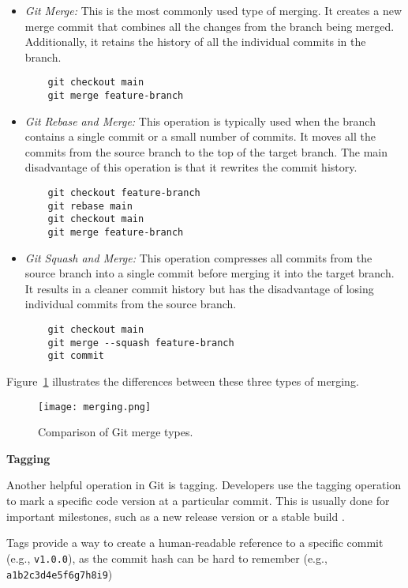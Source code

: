 \begin{itemize}
    \item \textit{Git Merge:} This is the most commonly used type of merging. It creates a new merge commit that combines all the changes from the branch being merged. Additionally, it retains the history of all the individual commits in the branch.
    \begin{verbatim}
    git checkout main
    git merge feature-branch
    \end{verbatim}

    \item \textit{Git Rebase and Merge:} This operation is typically used when the branch contains a single commit or a small number of commits. It moves all the commits from the source branch to the top of the target branch. The main disadvantage of this operation is that it rewrites the commit history.
    \begin{verbatim}
    git checkout feature-branch
    git rebase main
    git checkout main
    git merge feature-branch
    \end{verbatim}

    \item \textit{Git Squash and Merge:} This operation compresses all commits from the source branch into a single commit before merging it into the target branch. It results in a cleaner commit history but has the disadvantage of losing individual commits from the source branch.
    \begin{verbatim}
    git checkout main
    git merge --squash feature-branch
    git commit
    \end{verbatim}
\end{itemize}


Figure~\ref{fig:merging} illustrates the differences between these three types of merging. 

\begin{figure}[h!]
    \centering
    \texttt{[image: merging.png]}
    \caption{Comparison of Git merge types.}
    \label{fig:merging}
\end{figure}

\textbf{Tagging}

Another helpful operation in Git is tagging. Developers use the tagging operation to mark a specific code version at a particular commit. This is usually done for important milestones, such as a new release version or a stable build \cite{git}.

Tags provide a way to create a human-readable reference to a specific commit (e.g., \texttt{v1.0.0}), as the commit hash can be hard to remember (e.g., \texttt{a1b2c3d4e5f6g7h8i9})

